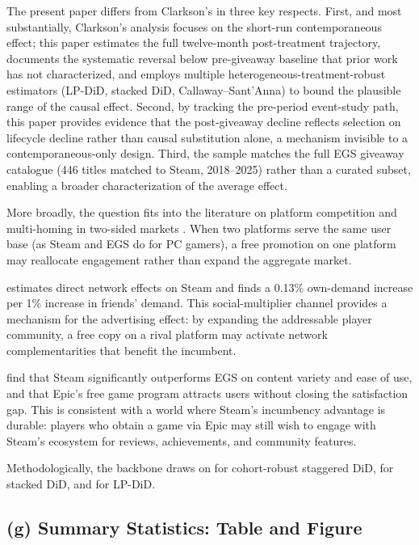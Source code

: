 \documentclass[11pt]{article}
\begin{document}
The present paper differs from Clarkson's in three key respects. First, and
most substantially, Clarkson's analysis focuses on the short-run
contemporaneous effect; this paper estimates the full twelve-month
post-treatment trajectory, documents the systematic reversal below
pre-giveaway baseline that prior work has not characterized, and employs
multiple heterogeneous-treatment-robust estimators (LP-DiD, stacked DiD,
Callaway--Sant'Anna) to bound the plausible range of the causal effect.
Second, by tracking the pre-period event-study path, this paper provides
evidence that the post-giveaway decline reflects selection on lifecycle
decline rather than causal substitution alone, a mechanism invisible to a
contemporaneous-only design. Third, the sample matches the full EGS giveaway
catalogue (446 titles matched to Steam, 2018--2025) rather than a curated
subset, enabling a broader characterization of the average effect.

More broadly, the question fits into the literature on platform competition
and multi-homing in two-sided markets \citep{rochet2003}. When two platforms
serve the same user base (as Steam and EGS do for PC gamers), a free
promotion on one platform may reallocate engagement rather than expand the
aggregate market.

\citet{tudon2022} estimates direct network effects on Steam and finds a
0.13\% own-demand increase per 1\% increase in friends' demand. This
social-multiplier channel provides a mechanism for the advertising effect:
by expanding the addressable player community, a free copy on a rival
platform may activate network complementarities that benefit the incumbent.

\citet{nabil2025} find that Steam significantly outperforms EGS on content
variety and ease of use, and that Epic's free game program attracts users
without closing the satisfaction gap. This is consistent with a world where
Steam's incumbency advantage is durable: players who obtain a game via Epic
may still wish to engage with Steam's ecosystem for reviews, achievements,
and community features.

Methodologically, the backbone draws on \citet{callaway2021} for
cohort-robust staggered DiD, \citet{cengiz2019} for stacked DiD, and
\citet{dube2023} for LP-DiD.

\subsection{(g) Summary Statistics: Table and Figure}
\end{document}
